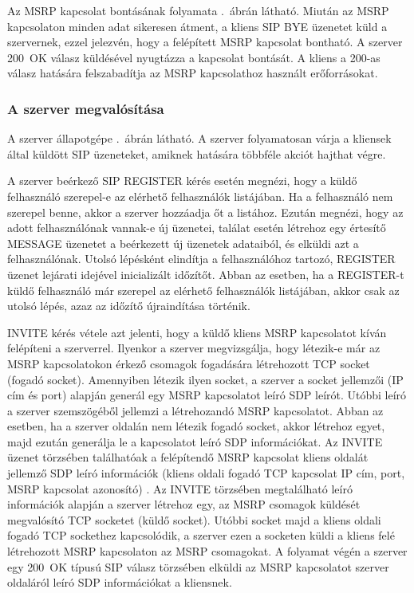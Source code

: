 Az MSRP kapcsolat bontásának folyamata .~ábrán látható. Miután az MSRP kapcsolaton minden adat sikeresen átment, a kliens SIP BYE üzenetet küld a szervernek, ezzel jelezvén, hogy a felépített MSRP kapcsolat bontható. A szerver 200~OK válasz küldésével nyugtázza a kapcsolat bontását. A kliens a 200-as válasz hatására felszabadítja az MSRP kapcsolathoz használt erőforrásokat.

\subsubsection{A szerver megvalósítása}
\label{sec:szervermegvalositas}

A szerver állapotgépe .~ábrán látható. A szerver folyamatosan várja a kliensek által küldött SIP üzeneteket, amiknek hatására többféle akciót hajthat végre.

A szerver beérkező SIP REGISTER kérés esetén megnézi, hogy a küldő felhasználó szerepel-e az elérhető felhasználók listájában. Ha a felhasználó nem szerepel benne, akkor a szerver hozzáadja őt a listához. Ezután megnézi, hogy az adott felhasználónak vannak-e új üzenetei, találat esetén létrehoz egy értesítő MESSAGE üzenetet a beérkezett új üzenetek adataiból, és elküldi azt a felhasználónak. Utolsó lépésként elindítja a felhasználóhoz tartozó, REGISTER üzenet lejárati idejével inicializált időzítőt. Abban az esetben, ha a REGISTER-t küldő felhasználó már szerepel az elérhető felhasználók listájában, akkor csak az utolsó lépés, azaz az időzítő újraindítása történik.

INVITE kérés vétele azt jelenti, hogy a küldő kliens MSRP kapcsolatot kíván felépíteni a szerverrel. Ilyenkor a szerver megvizsgálja, hogy létezik-e már az MSRP kapcsolatokon érkező csomagok fogadására létrehozott TCP socket (fogadó socket). Amennyiben létezik ilyen socket, a szerver a socket jellemzői (IP cím és port) alapján generál egy MSRP kapcsolatot leíró SDP leírót. Utóbbi leíró a szerver szemszögéből jellemzi a létrehozandó MSRP kapcsolatot. Abban az esetben, ha a szerver oldalán nem létezik fogadó socket, akkor létrehoz egyet, majd ezután generálja le a kapcsolatot leíró SDP információkat.  Az INVITE üzenet törzsében találhatóak a felépítendő MSRP kapcsolat kliens oldalát jellemző SDP leíró információk (kliens oldali fogadó TCP kapcsolat IP cím, port, MSRP kapcsolat azonosító) . Az INVITE törzsében megtalálható leíró információk alapján a szerver létrehoz egy, az MSRP csomagok küldését megvalósító TCP socketet (küldő socket). Utóbbi socket majd a kliens oldali fogadó TCP sockethez kapcsolódik, a szerver ezen a socketen küldi a kliens felé létrehozott MSRP kapcsolaton az MSRP csomagokat. A folyamat végén a szerver egy 200~OK típusú SIP válasz törzsében elküldi az MSRP kapcsolatot szerver oldaláról leíró SDP információkat a kliensnek.

